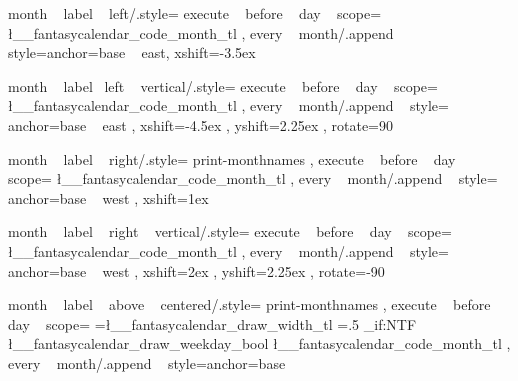 %
%



\tikzset
  {
    month ~ label ~ left/.style=
      {
        execute ~ before ~ day ~ scope=
          {
             { \l__fantasycalendar_code_month_tl }
          }
        ,
        every ~ month/.append ~ style={anchor=base ~ east, xshift=-3.5ex}
      }
  }

\tikzset
  {
    month ~ label ~left ~ vertical/.style=
      {
        execute ~ before ~ day ~ scope=
          {
             { \l__fantasycalendar_code_month_tl } 
          } ,
        every ~ month/.append ~ style=
          { anchor=base ~ east , xshift=-4.5ex , yshift=2.25ex , rotate=90 }
      }
  }

\tikzset
  {
    month ~ label ~ right/.style=
      {
        print-monthnames ,
        execute ~ before ~ day ~ scope=
          {
              {
                {
                  \l__fantasycalendar_code_month_tl
                }
              }
          }
        ,
        every ~ month/.append ~ style={ anchor=base ~ west , xshift=1ex }
    }
  }

\tikzset
  {
    month ~ label ~ right ~ vertical/.style=
      {
        execute ~ before ~ day ~ scope=
          {
              {
                {
                  \l__fantasycalendar_code_month_tl%
                }
              }
          }
        ,
        every ~ month/.append ~ style=
          { anchor=base ~ west , xshift=2ex , yshift=2.25ex , rotate=-90 }
    }
  }




\tikzset
  {
    month ~ label ~ above ~ centered/.style=
      {
        print-monthnames ,
        execute ~ before ~ day ~ scope=
          {
              {
                {
                  \pgf@xb=\l__fantasycalendar_draw_width_tl\pgf@xa%
                  \pgf@xb=.5\pgf@xb%
                  \pgftransformxshift{\pgf@xb}
                  \bool_if:NTF \l__fantasycalendar_draw_weekday_bool
                    {  }
                    {  }
                  \l__fantasycalendar_code_month_tl
                }
              } 
          }
        ,
        every ~ month/.append ~ style={anchor=base}
      }
  }


